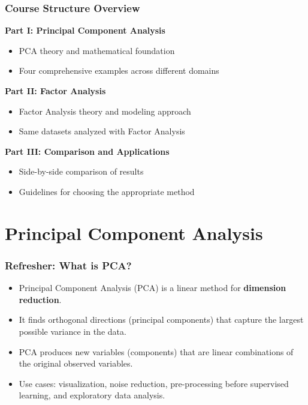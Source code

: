 \documentclass[aspectratio=169]{beamer}
\begin{document}
\begin{frame}[fragile]
    \frametitle{Course Structure Overview}
    \textbf{Part I: Principal Component Analysis}
    \begin{itemize}
        \item PCA theory and mathematical foundation
        \item Four comprehensive examples across different domains
    \end{itemize}
    \vspace{12pt}
    \textbf{Part II: Factor Analysis}
    \begin{itemize}
        \item Factor Analysis theory and modeling approach  
        \item Same datasets analyzed with Factor Analysis
    \end{itemize}
    \vspace{12pt}
    \textbf{Part III: Comparison and Applications}
    \begin{itemize}
        \item Side-by-side comparison of results
        \item Guidelines for choosing the appropriate method
    \end{itemize}
\end{frame}

\section{Principal Component Analysis}

\begin{frame}
    \frametitle{Refresher: What is PCA?}
    \begin{itemize}
        \item Principal Component Analysis (PCA) is a linear method for \textbf{dimension reduction}. \pause
        \item It finds orthogonal directions (principal components) that capture the largest possible variance in the data. \pause
        \item PCA produces new variables (components) that are linear combinations of the original observed variables. \pause
        \item Use cases: visualization, noise reduction, pre-processing before supervised learning, and exploratory data analysis. \pause
    \end{itemize}
\end{frame}
\end{document}
